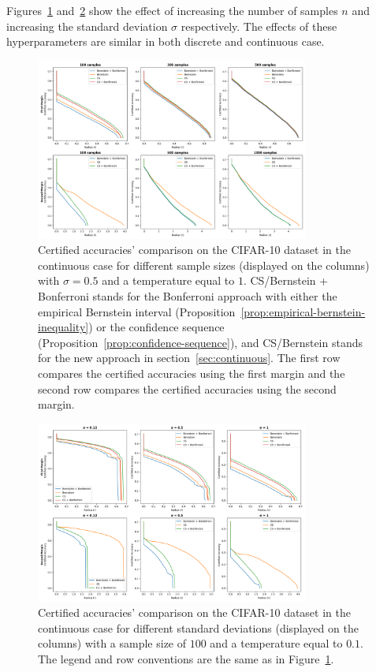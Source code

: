 Figures~\ref{fig:cont_num} and~\ref{fig:cont_sigma} show the effect of increasing the number of samples $n$ and increasing the standard deviation $\sigma$ respectively.
The effects of these hyperparameters are similar in both discrete and continuous case.
\begin{figure}[htbp]
    \centering
    \includegraphics[width=0.8\textwidth]{images/cont_num}
    \caption{Certified accuracies' comparison on the CIFAR-10 dataset in the continuous case for different sample sizes (displayed on the columns) with $\sigma = 0.5$ and a temperature equal to $1$. CS/Bernstein + Bonferroni stands for the Bonferroni approach with either the empirical Bernstein interval (Proposition~\ref{prop:empirical-bernstein-inequality}) or the confidence sequence (Proposition~\ref{prop:confidence-sequence}), and CS/Bernstein stands for the new approach in section~\ref{sec:continuous}. The first row compares the certified accuracies using the first margin and the second row compares the certified accuracies using the second margin.}
    \label{fig:cont_num}
\end{figure}
\begin{figure}[htbp]
    \centering
    \includegraphics[width=0.8\textwidth]{images/cont_sigma}
    \caption{Certified accuracies' comparison on the CIFAR-10 dataset in the continuous case for different standard deviations (displayed on the columns) with a sample size of $100$ and a temperature equal to $0.1$. The legend and row conventions are the same as in Figure~\ref{fig:cont_num}.}
    \label{fig:cont_sigma}
\end{figure}
